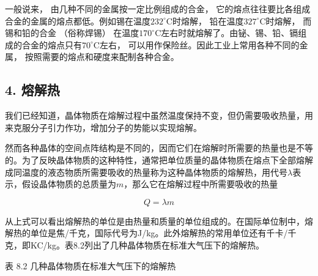 一般说来， 由几种不同的金属按一定比例组成的合金，
它的熔点往往要比各组成合金的金属的熔点都低。例如锡在温度\(232^{\circ} \mathrm{C}\)时熔解，
铅在温度\(327^{\circ} \mathrm{C}\)时熔解， 而锡和铅的合金 （俗称焊锡）
在温度\(170^{\circ} \mathrm{C}\)左右时就熔解了。由铋、锡、铅、镉组成的合金的熔点只有\(70^{\circ} \mathrm{C}\)左右，
可以用作保险丝。因此工业上常用各种不同的金属，
按照需要的熔点和硬度来配制各种合金。

\subsection{4. 熔解热}\label{ux7194ux89e3ux70ed}

我们已经知道，晶体物质在熔解过程中虽然温度保持不变，但仍需要吸收热量，用来克服分子引力作功，增加分子的势能以实现熔解。

然而各种晶体的空间点阵结构是不同的，因而它们在熔解时所需要的热量也是不等的。为了反映晶体物质的这种特性，通常把单位质量的晶体物质在熔点下全部熔解成同温度的液态物质所需要吸收的热量称为这种晶体物质的熔解热，用代号\(\lambda\)表示，假设晶体物质的总质量为\(m\)，那么它在熔解过程中所需要吸收的热量

\[
Q = \lambda m \tag {8.1}
\]

从上式可以看出熔解热的单位是由热量和质量的单位组成的。在国际单位制中，熔解热的单位是焦/千克，国际代号为J/kg。此外熔解热的常用单位还有千卡/千克，即KC/kg。表8.2列出了几种晶体物质在标准大气压下的熔解热。

表 8.2 几种晶体物质在标准大气压下的熔解热

